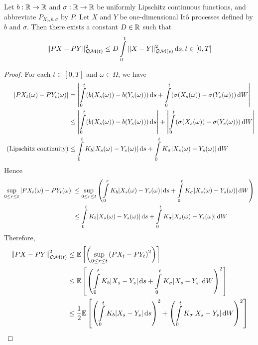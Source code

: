 \begin{lemma}
  \label{lemma:inequality-for-Piscard-operator-and-QM-norm}
  Let $b:\mathbb{R}\to\mathbb{R}$ and $\sigma:\mathbb{R}\to\mathbb{R}$ be uniformly Lipschitz continuous functions, and abbreviate $P_{X_0,b,\sigma}$ by $P$. Let $X$ and $Y$ be one-dimensional Itô processes defined by $b$ and $\sigma$. Then there exists a constant $D\in\mathbb{R}$ such that
  \begin{equation}
    \|PX - PY\|_{\mathcal{Q}\mathcal{M}(t)}^2 \le D\int\limits_0^t\|X-Y\|_{\mathcal{Q}\mathcal{M}(s)}^2\,\mathrm{d} s, t\in[0,T]
  \end{equation}
\end{lemma}

\begin{proof}
  For each $t\in[0,T]$ and $\omega\in\Omega$, we have
  \begin{align*}
    \left|PX_t(\omega)-PY_t(\omega)\right|
                                   & = \left|\int\limits_0^t (b(X_s(\omega))-b(Y_s(\omega)))\,\mathrm{d} s + \int\limits_0^t (\sigma(X_s(\omega))-\sigma(Y_s(\omega)))\,\mathrm{d} W\right|                \\
                                   & \le \left|\int\limits_0^t (b(X_s(\omega))-b(Y_s(\omega)))\,\mathrm{d} s\right| + \left|\int\limits_0^t (\sigma(X_s(\omega))-\sigma(Y_s(\omega)))\,\mathrm{d} W\right| \\
    \text{ (Lipschitz continuity)} & \le \int\limits_0^t K_b|X_s(\omega)-Y_s(\omega)|\,\mathrm{d} s + \int\limits_0^t K_\sigma|X_s(\omega)-Y_s(\omega)|\,\mathrm{d} W                                      \\
  \end{align*}
  Hence
  \begin{align*}
    \sup\limits_{0\le r\le t}\left|PX_t(\omega)-PY_t(\omega)\right|
     & \le \sup\limits_{0\le r\le t}\left(\int\limits_0^r K_b|X_s(\omega)-Y_s(\omega)|\,\mathrm{d} s + \int\limits_0^r K_\sigma|X_s(\omega)-Y_s(\omega)|\,\mathrm{d} W\right) \\
     & \le \int\limits_0^t K_b|X_s(\omega)-Y_s(\omega)|\,\mathrm{d} s + \int\limits_0^t K_\sigma|X_s(\omega)-Y_s(\omega)|\,\mathrm{d} W
  \end{align*}
  Therefore,
  \begin{align*}
    \left\|PX-PY\right\|_{\Q\M(t)}^2
     & \le \EE\left[\left(\sup\limits_{0\le r\le t}\left(PX_t-PY_t\right)^2\right)\right]                                                   \\
     & \le  \EE\left[\left(\int\limits_0^t K_b|X_s-Y_s|\d s + \int\limits_0^t K_\sigma|X_s-Y_s|\d W\right)^2\right]                         \\
     & \le \dfrac{1}{2}\EE\left[\left(\int\limits_0^t K_b|X_s-Y_s|\d s\right)^2+\left(\int\limits_0^t K_\sigma|X_s-Y_s|\d W\right)^2\right] \\

\end{align*}
\end{proof}
